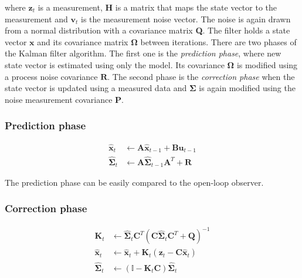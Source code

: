 where $\textbf{z}_t$ is a measurement, \textbf{H} is a matrix that maps the state vector to the measurement and $\textbf{v}_t$ is the measurement noise vector. The noise is again drawn from a normal distribution with a covariance matrix \textbf{Q}. The filter holds a state vector $\textbf{\^x}$ and its covariance matrix $\boldsymbol{\Omega}$ between iterations. There are two phases of the Kalman filter algorithm. The first one is the \textit{prediction phase}, where new state vector is estimated using only the model. Its covariance $\boldsymbol{\Omega}$ is modified using a process noise covariance $\textbf{R}$. The second phase is the \textit{correction phase} when the state vector is updated using a measured data and $\boldsymbol{\Sigma}$ is again modified using the noise measurement covariance \textbf{P}.      

\subsubsection*{Prediction phase}

\begin{equation}
\begin{split}
\hat{\textbf{x}}_t &\leftarrow \textbf{A}\hat{\textbf{x}}_{t-1} + \textbf{B}\textbf{u}_{t-1} \\
\hat{\boldsymbol{\Sigma}}_t &\leftarrow \textbf{A}\hat{\boldsymbol{\Sigma}}_{t-1}\textbf{A}^{T} + \textbf{R}
\end{split}
\end{equation}

The prediction phase can be easily compared to the open-loop observer. 

\subsubsection*{Correction phase}

\begin{equation}
\begin{split}
\textbf{K}_t &\leftarrow \hat{\boldsymbol{\Sigma}}_t\textbf{C}^{T}\left(\textbf{C}\hat{\boldsymbol{\Sigma}}_t\textbf{C}^{T} + \textbf{Q}\right)^{-1} \\
\hat{\textbf{x}}_t &\leftarrow \hat{\textbf{x}}_t + \textbf{K}_t\left(\textbf{z}_t - \textbf{C}\hat{\textbf{x}}_t\right) \\
\hat{\boldsymbol{\Sigma}}_t &\leftarrow \left(\mathbb{I} - \textbf{K}_t\textbf{C}\right)\hat{\boldsymbol{\Sigma}}_t
\end{split}
\end{equation}

